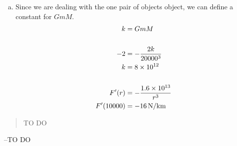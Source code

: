 \documentclass[letterpaper, landscape]{exam}
\begin{document}
\begin{description}
\begin{enumerate}[(a)]
        \item Since we are dealing with the one pair of objects object, we can define a constant for $GmM$.
          \begin{align*}
            k         & = G m M \\
            \\
            -2        & = - \frac{2 k}{20000^3} \\
            k         & = 8 \times 10^{12} \\
            \\
            F'(r)     & = - \frac{1.6 \times 10^{13}}{r^3} \\
            F'(10000) & = \unit[-16]{N/km} \\
          \end{align*}

      \end{enumerate}





  \end{description}

  \else
    \vspace{10 cm}
    \begin{quote}
      \begin{em}
        TO DO
      \end{em}
    \end{quote}
    \hspace{2 cm} --TO DO
  \fi
\end{document}
